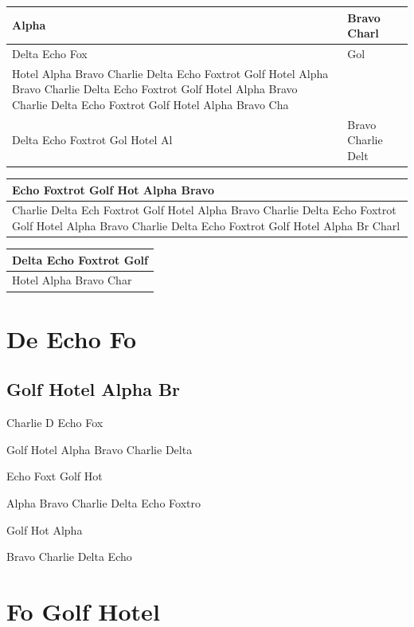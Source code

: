 \documentclass[11pt,a4paper]{article}
\begin{document}
\begin{table}[h]
\begin{tabular}{|l|l|}
\hline
Alpha  & Bravo Charl \\ \hline
Delta Echo Fox & Gol \\ \hline
Hotel Alpha  Bravo Charlie Delta Echo Foxtrot Golf Hotel Alpha Bravo Charlie  Delta Echo Foxtrot Golf Hotel Alpha Bravo Charlie Delta Echo Foxtrot Golf Hotel Alpha Bravo Cha &  \\ \hline
Delta Echo Foxtrot Gol  Hotel Al & Bravo Charlie Delt \\ \hline
\end{tabular}
\end{table}

\begin{table}[h]
\begin{tabular}{|l|}
\hline
Echo Foxtrot  Golf Hot  Alpha Bravo  \\ \hline
Charlie Delta Ech  Foxtrot Golf Hotel Alpha Bravo Charlie Delta Echo Foxtrot Golf Hotel Alpha Bravo Charlie Delta Echo Foxtrot Golf Hotel Alpha Br  Charl \\ \hline
\end{tabular}
\end{table}

\begin{table}[h]
\begin{tabular}{|l|}
\hline
Delta Echo Foxtrot Golf \\ \hline
Hotel Alpha Bravo Char \\ \hline
\end{tabular}
\end{table}

\section{De	Echo Fo}

\subsection{Golf	Hotel Alpha Br}

Charlie D			Echo Fox

Golf Hotel Alpha Bravo Charlie Delta

Echo Foxt			Golf Hot

Alpha Bravo Charlie Delta Echo Foxtro

Golf Hot			Alpha

Bravo Charlie Delta Echo

\section{Fo	Golf Hotel}
\end{document}
